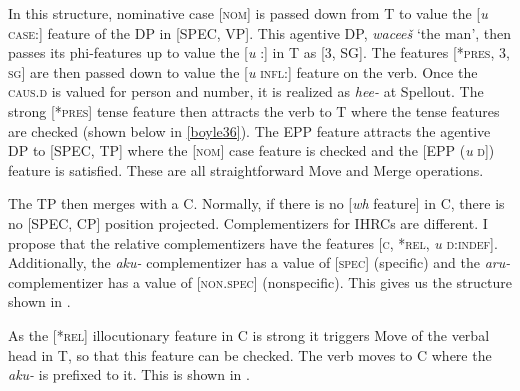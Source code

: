 \documentclass[output=paper]{LSP/langsci}
\begin{document}
In this structure, nominative case [\textsc{nom}] is passed down from T to value the [\textit{u} \textsc{case}:] feature of the DP in [SPEC, VP]. This agentive DP, \textit{wacee\v{s}} `the man', then passes its phi-features up to value the [\textit{u} :] in T as [3, SG].  The features [*\textsc{pres, 3, sg}] are then passed down to value the [\textit{u} \textsc{infl}:] feature on the verb. Once the \textsc{caus.d} is valued for person and number, it is realized as \textit{hee-} at Spellout. The strong [*\textsc{pres}] tense feature then attracts the verb to T where the tense features are checked (shown below in \ref{boyle36}). The EPP feature attracts the agentive DP to [SPEC, TP] where the [\textsc{nom}] case feature is checked and the [EPP (\textit{u} \textsc{d}]) feature is satisfied. These are all straightforward Move and Merge operations.
	
The TP then merges with a C. Normally, if there is no [\textit{wh} feature] in C, there is no [SPEC, CP] position projected. Complementizers for IHRCs are different.  I propose that the  relative complementizers have the features [\textsc{c, *rel,} \textit{u} \textsc{d:indef}].  Additionally, the \textit{aku-} complementizer has a value of [\textsc{spec}] (specific) and the \textit{aru-} complementizer has a value of [\textsc{non.spec}] (nonspecific). This gives us the structure shown in .

\ea \label{boyle36}
{\hspace{1em}}\newline

\z

As the [*\textsc{rel}] illocutionary feature in C is strong it triggers Move of the verbal head in T, so that this feature can be checked. The verb moves to C where the \textit{aku-} is prefixed to it. This is shown in .
\end{document}
